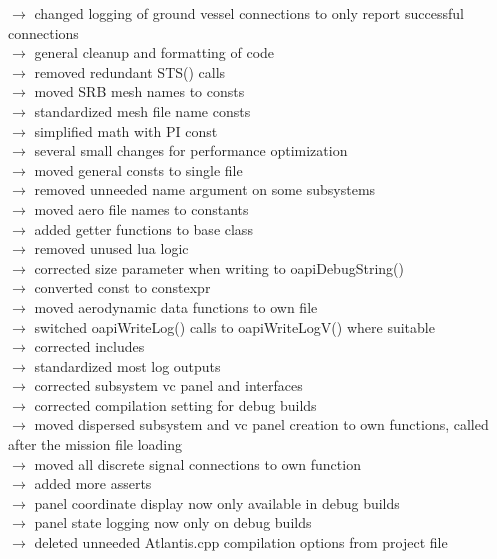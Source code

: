 \documentclass[Space_Shuttle_Vessel_Manual.tex]{subfiles}
\begin{document}
$\rightarrow$ changed logging of ground vessel connections to only report successful connections\\
$\rightarrow$ general cleanup and formatting of code\\
$\rightarrow$ removed redundant STS() calls\\
$\rightarrow$ moved SRB mesh names to consts\\
$\rightarrow$ standardized mesh file name consts\\
$\rightarrow$ simplified math with PI const\\
$\rightarrow$ several small changes for performance optimization\\
$\rightarrow$ moved general consts to single file\\
$\rightarrow$ removed unneeded name argument on some subsystems\\
$\rightarrow$ moved aero file names to constants\\
$\rightarrow$ added getter functions to base class\\
$\rightarrow$ removed unused lua logic\\
$\rightarrow$ corrected size parameter when writing to oapiDebugString()\\
$\rightarrow$ converted const to constexpr\\
$\rightarrow$ moved aerodynamic data functions to own file\\
$\rightarrow$ switched oapiWriteLog() calls to oapiWriteLogV() where suitable\\
$\rightarrow$ corrected includes\\
$\rightarrow$ standardized most log outputs\\
$\rightarrow$ corrected subsystem vc panel and interfaces\\
$\rightarrow$ corrected compilation setting for debug builds\\
$\rightarrow$ moved dispersed subsystem and vc panel creation to own functions, called after the mission file loading\\
$\rightarrow$ moved all discrete signal connections to own function\\
$\rightarrow$ added more asserts\\
$\rightarrow$ panel coordinate display now only available in debug builds\\
$\rightarrow$ panel state logging now only on debug builds\\
$\rightarrow$ deleted unneeded Atlantis.cpp compilation options from project file\\
\end{document}
